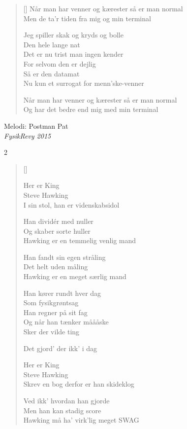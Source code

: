 {\begin{multicols}
\begin{verse}[\versewidth]
Når man har venner og kærester så er man normal\\
Men de ta'r tiden fra mig og min terminal

Jeg spiller skak og kryds og bolle\\
Den hele lange nat\\
Det er nu trist man ingen kender\\
For selvom den er dejlig\\
Så er den datamat\\
Nu kun et surrogat for menn'ske-venner

Når man har venner og kærester så er man normal\\
Og har det bedre end mig med min terminal
\end{verse}
\end{multicols}

{Melodi: Postman Pat}\\[.2em]
{\small\itshape FysikRevy 2015}
\begin{multicols}2
\settowidth{\versewidth}{Hawking han har helt vildt meget SWAG}
\begin{verse}[\versewidth]

Her er King\\
Steve Hawking\\
I sin stol, han er videnskabsidol

Han dividér med nuller\\
Og skaber sorte huller\\
Hawking er en temmelig venlig mand

Han fandt sin egen stråling\\
Det helt uden måling\\
Hawking er en meget særlig mand

Han kører rundt hver dag\\
Som fysikgrøntsag\\
Han regner på sit fag\\
Og når han tænker måååske\\
Sker der vilde ting

Det gjord' der ikk' i dag

Her er King\\
Steve Hawking\\
Skrev en bog derfor er han skideklog

Ved ikk' hvordan han gjorde\\
Men han kan stadig score\\
Hawking må ha' virk'lig meget SWAG


\end{verse}
\end{multicols}}
